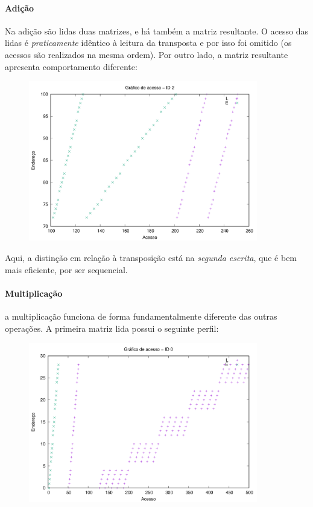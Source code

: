 \documentclass{article}
\begin{document}
\paragraph{Adição} Na adição são lidas duas matrizes, e há também a matriz resultante. O acesso das lidas é \textit{praticamente} idêntico à leitura da transposta e por isso foi omitido (os acessos são realizados na mesma ordem). Por outro lado, a matriz resultante apresenta comportamento diferente:

\begin{figure} [H]
    \includegraphics[width=10cm]{s-acesso-2.png} 
    \centering
\end{figure}

Aqui, a distinção em relação à transposição está na \textit{segunda escrita}, que é bem mais eficiente, por ser sequencial.

\paragraph{Multiplicação} a multiplicação funciona de forma fundamentalmente diferente das outras operações. A primeira matriz lida possui o seguinte perfil:

\begin{figure} [H]
    \includegraphics[width=10cm]{m-acesso-0.png} 
    \centering
\end{figure}
\end{document}
